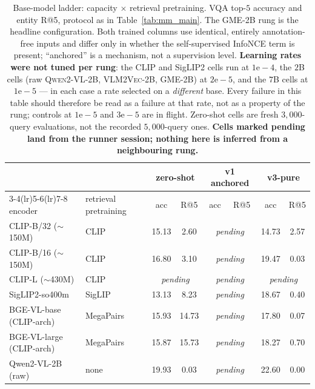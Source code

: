 \begin{table}[t]
\centering\small
\caption{Base-model ladder: capacity $\times$ retrieval pretraining. VQA top-$5$ accuracy and
entity R@5, protocol as in Table~\ref{tab:mm_main}. The \textsc{GME-2B} rung is the headline
configuration. Both trained columns use identical, entirely annotation-free inputs and differ
only in whether the self-supervised InfoNCE term is present; ``anchored'' is a mechanism, not a
supervision level. \textbf{Learning rates were not tuned per rung}: the CLIP and SigLIP2 cells
run at $1\mathrm{e}{-}4$, the $2$B cells (raw \textsc{Qwen2-VL-2B}, \textsc{VLM2Vec-2B},
\textsc{GME-2B}) at $2\mathrm{e}{-}5$, and the $7$B cells at $1\mathrm{e}{-}5$ --- in each case a
rate selected on a \emph{different} base. Every failure in this table should therefore be read as
a failure at that rate, not as a property of the rung; controls at $1\mathrm{e}{-}5$ and
$3\mathrm{e}{-}5$ are in flight. Zero-shot cells are fresh $3{,}000$-query evaluations, not the recorded
$5{,}000$-query ones. \textbf{Cells marked pending land from the runner session; nothing here is
inferred from a neighbouring rung.}}
\label{tab:mm_ladder}
\begin{tabular}{llcccccc}
\toprule
& & \multicolumn{2}{c}{zero-shot} & \multicolumn{2}{c}{v1 anchored} & \multicolumn{2}{c}{v3-pure} \\
\cmidrule(lr){3-4}\cmidrule(lr){5-6}\cmidrule(lr){7-8}
encoder & retrieval pretraining & acc & R@5 & acc & R@5 & acc & R@5 \\
\midrule
CLIP-B/32 ($\sim$150M) & CLIP   & 15.13 & 2.60 & \multicolumn{2}{c}{\emph{pending}} & 14.73 & 2.57 \\
CLIP-B/16 ($\sim$150M) & CLIP   & 16.80 & 3.10 & \multicolumn{2}{c}{\emph{pending}} & 19.47 & 0.03 \\
CLIP-L ($\sim$430M)    & CLIP   & \multicolumn{2}{c}{\emph{pending}} & \multicolumn{2}{c}{\emph{pending}} & \multicolumn{2}{c}{\emph{pending}} \\
SigLIP2-so400m         & SigLIP & 13.13 & 8.23 & \multicolumn{2}{c}{\emph{pending}} & 18.67 & 0.40 \\
BGE-VL-base (CLIP-arch)  & MegaPairs & 15.93 & 14.73 & \multicolumn{2}{c}{\emph{pending}} & 17.80 & 0.07 \\
BGE-VL-large (CLIP-arch) & MegaPairs & 15.87 & 15.73 & \multicolumn{2}{c}{\emph{pending}} & 18.27 & 0.70 \\
\midrule
Qwen2-VL-2B (raw)      & none             & 19.93 & 0.03 & \multicolumn{2}{c}{\emph{pending}} & 22.60 & 0.00 \\

\end{tabular}
\end{table}
